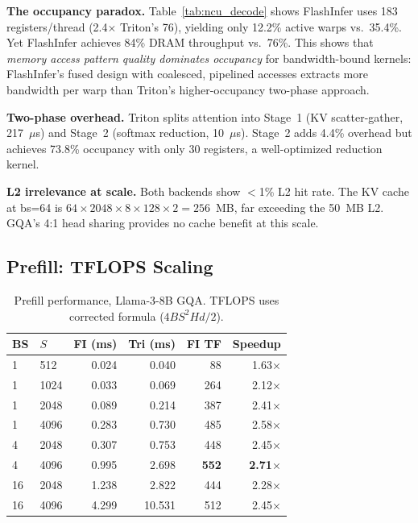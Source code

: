 \documentclass[10pt,twocolumn]{article}
\begin{document}
\textbf{The occupancy paradox.}  Table~\ref{tab:ncu_decode} shows FlashInfer uses 183 registers/thread (2.4$\times$ Triton's 76), yielding only 12.2\% active warps vs.\ 35.4\%.  Yet FlashInfer achieves 84\% DRAM throughput vs.\ 76\%.  This shows that \emph{memory access pattern quality dominates occupancy} for bandwidth-bound kernels: FlashInfer's fused design with coalesced, pipelined accesses extracts more bandwidth per warp than Triton's higher-occupancy two-phase approach.

\textbf{Two-phase overhead.}  Triton splits attention into Stage~1 (KV scatter-gather, 217~$\mu$s) and Stage~2 (softmax reduction, 10~$\mu$s).  Stage~2 adds 4.4\% overhead but achieves 73.8\% occupancy with only 30 registers, a well-optimized reduction kernel.

\textbf{L2 irrelevance at scale.}  Both backends show $<$1\% L2 hit rate.  The KV cache at bs=64 is $64 \times 2048 \times 8 \times 128 \times 2 = 256$~MB, far exceeding the 50~MB L2.  GQA's 4:1 head sharing provides no cache benefit at this scale.

\subsection{Prefill: TFLOPS Scaling}
\label{sec:prefill}

\begin{table}[h]
\centering
\small
\caption{Prefill performance, Llama-3-8B GQA.  TFLOPS uses corrected formula ($4 B S^2 H d / 2$).}
\label{tab:prefill}
\begin{tabular}{@{}llrrrr@{}}
\toprule
BS & $S$ & FI (ms) & Tri (ms) & FI TF & Speedup \\
\midrule
 1 &  512 & 0.024 & 0.040 &   88 & 1.63$\times$ \\
 1 & 1024 & 0.033 & 0.069 &  264 & 2.12$\times$ \\
 1 & 2048 & 0.089 & 0.214 &  387 & 2.41$\times$ \\
 1 & 4096 & 0.283 & 0.730 &  485 & 2.58$\times$ \\
 4 & 2048 & 0.307 & 0.753 &  448 & 2.45$\times$ \\
 4 & 4096 & 0.995 & 2.698 &  \textbf{552} & \textbf{2.71$\times$} \\
16 & 2048 & 1.238 & 2.822 &  444 & 2.28$\times$ \\
16 & 4096 & 4.299 &10.531 &  512 & 2.45$\times$ \\
\bottomrule
\end{tabular}
\end{table}
\end{document}
